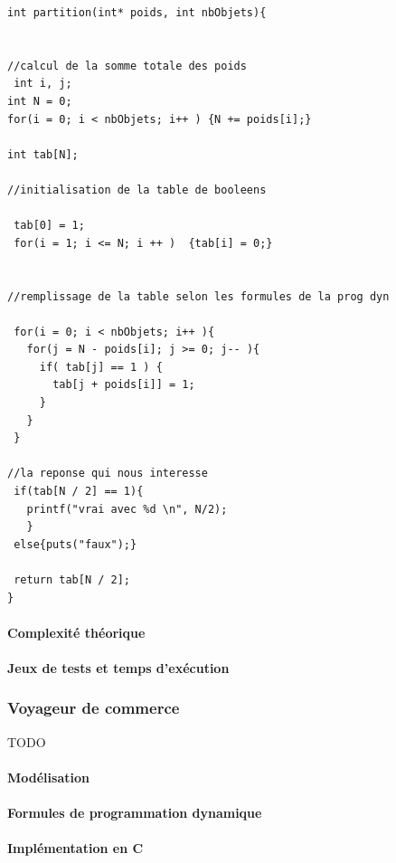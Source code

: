 \documentclass[a4paper, 12pt]{article}
\begin{document}
\begin{lstlisting}
int partition(int* poids, int nbObjets){ 


//calcul de la somme totale des poids
 int i, j;
int N = 0;
for(i = 0; i < nbObjets; i++ ) {N += poids[i];}

int tab[N]; 

//initialisation de la table de booleens

 tab[0] = 1;
 for(i = 1; i <= N; i ++ )  {tab[i] = 0;}


//remplissage de la table selon les formules de la prog dyn

 for(i = 0; i < nbObjets; i++ ){
   for(j = N - poids[i]; j >= 0; j-- ){
     if( tab[j] == 1 ) {
       tab[j + poids[i]] = 1;
     }
   }
 }

//la reponse qui nous interesse
 if(tab[N / 2] == 1){ 
   printf("vrai avec %d \n", N/2);
   }
 else{puts("faux");}

 return tab[N / 2];
}

\end{lstlisting}

\paragraph{Complexité théorique}

\paragraph{Jeux de tests et temps d'exécution}

\subsubsection{Voyageur de commerce}

TODO

\paragraph{Modélisation}

\paragraph{Formules de programmation dynamique}

\paragraph{Implémentation en C}
\end{document}
